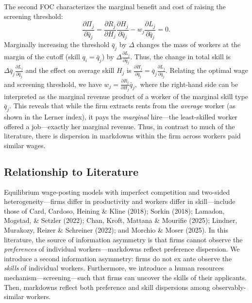 \documentclass[11pt]{article}
\begin{document}
The second FOC characterizes the marginal benefit and cost of raising the screening threshold:
\begin{equation}
    \frac{\partial \Pi_j}{\partial \bar{q}_j} = \frac{\partial R_j}{\partial H_j}\frac{\partial H_j}{\partial \bar q_j}  - w_j \frac{\partial L_j}{\partial \bar q_j} = 0.
\end{equation}
Marginally increasing the threshold $\bar q_j$ by $\Delta$ changes the mass of workers at the margin of the cutoff (skill $q_i = \bar{q}_j$) by $\Delta \frac{\partial L_j}{\partial \bar q_j}$. Thus, the change in total skill is $\Delta \bar q_j \frac{\partial L_j}{\partial \bar q_j}$ and the effect on average skill $H_j$ is $ \frac{\partial H_j}{\partial \bar{q}_j} = \bar{q}_j\frac{\partial L_j}{\partial \bar{q}_j}$. Relating the optimal wage and screening threshold, we have $w_j = \frac{\partial R_j}{\partial H_j} \bar{q}_j,$ where the right-hand side can be interpreted as the marginal revenue product of a worker of the marginal skill type $\bar q_j$. This reveals that while the firm extracts rents from the \textit{average} worker (as shown in the Lerner index), it pays the \textit{marginal} hire---the least-skilled worker offered a job---exactly her marginal revenue. Thus, in contrast to much of the literature, there is dispersion in markdowns within the firm across workers paid similar wages.



\subsection{Relationship to Literature}

Equilibrium wage-posting models with imperfect competition and two-sided heterogeneity---firms differ in productivity and workers differ in skill---include those of Card, Cardoso, Heining \& Kline (2018); Sorkin (2018); Lamadon, Mogstad, \& Setzler (2022); Chan, Kroft, Mattana \& Mourifie (2025); Lindner, Murakozy, Reizer \& Schreiner (2022); and Morchio \& Moser (2025).  In this literature, the source of information asymmetry is that firms cannot observe the \emph{preferences} of individual workers---markdowns reflect preference dispersion. We introduce a second information asymmetry:  firms do not ex ante observe the \emph{skills} of individual workers. Furthermore, we introduce a human resources mechanism---screening---such that firms can uncover the skills of their applicants. Then, markdowns reflect both preference and skill dispersions among observably-similar workers. 
\end{document}
